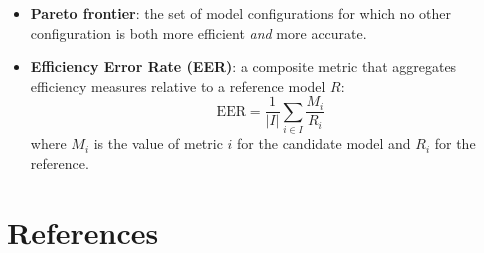 \documentclass[12pt,a4paper]{report}
\begin{document}
\begin{itemize}[itemsep=2pt]
    \item \textbf{Pareto frontier}: the set of model configurations for which
          no other configuration is both more efficient \emph{and} more
          accurate.
    \item \textbf{Efficiency Error Rate (EER)}: a composite metric that
          aggregates efficiency measures relative to a reference model $R$:
          \[
              \mathrm{EER} = \frac{1}{|I|}\sum_{i\in I}\frac{M_i}{R_i}
          \]
          where $M_i$ is the value of metric $i$ for the candidate model and
          $R_i$ for the reference.
\end{itemize}

\chapter*{References}
\end{document}
